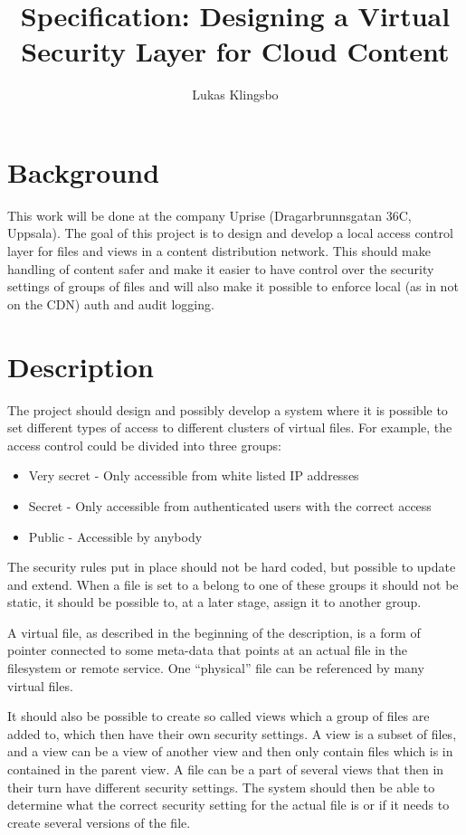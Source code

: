 \documentclass[a4paper,12pt]{article}
\title{\textbf{Specification: Designing a Virtual Security Layer for Cloud Content}}
\author{Lukas Klingsbo}
\begin{document}
\maketitle

\setcounter{tocdepth}{3}
\tableofcontents

\clearpage
{}
\setcounter{page}{1}
\section{Background}
This work will be done at the company Uprise (Dragarbrunnsgatan 36C, Uppsala). 
The goal of this project is to design and develop a local access control layer 
for files and views in a content distribution network.
This should make handling of content safer and make it easier to have control 
over the security settings of groups of files and will also make 
it possible to enforce local (as in not on the CDN) auth and audit logging.

\section{Description}
The project should design and possibly develop a system where it is possible 
to set different types of access to different clusters of virtual files. 
For example, the access control could be divided into three groups:
\begin{itemize}
  \item Very secret - Only accessible from white listed IP addresses
  \item Secret - Only accessible from authenticated users with the correct access
  \item Public - Accessible by anybody
\end{itemize}
The security rules put in place should not be hard coded, but possible to update 
and extend. When a file is set to a belong to one of these groups it should not be static, 
it should be possible to, at a later stage, assign it to another group.

A virtual file, as described in the beginning of the description, is a form of pointer 
connected to some meta-data that points at an actual file in the filesystem or remote 
service. One ``physical'' file can be referenced by many virtual files.

It should also be possible to create so called views which a group 
of files are added to, which then have their own security settings.
A view is a subset of files, and a view can be a view of another view and then 
only contain files which is in contained in the parent view. 
A file can be a part of several views that then in their turn have different 
security settings. The system should then be able to determine what the correct 
security setting for the actual file is or if it needs to create several versions 
of the file. 
\end{document}
